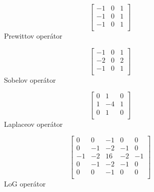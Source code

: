     \begin{figure}[!ht]
        \centering

        \begin{minipage}[b]{0.2\textwidth}
            \[
                \begin{bmatrix}
                    -1 & 0 & 1 \\
                    -1 & 0 & 1 \\
                    -1 & 0 & 1 \\
                \end{bmatrix}
            \]
            \centering
            Prewittov operátor
        \end{minipage}
        \begin{minipage}[b]{0.2\textwidth}
            \[
                \begin{bmatrix}
                    -1 & 0 & 1 \\
                    -2 & 0 & 2 \\
                    -1 & 0 & 1 \\
                \end{bmatrix}
            \]
            \centering
            Sobelov operátor
        \end{minipage}
        \begin{minipage}[b]{0.2\textwidth}
            \[
                \begin{bmatrix}
                    0 &  1 & 0 \\
                    1 & -4 & 1 \\
                    0 &  1 & 0 \\
                \end{bmatrix}
            \]
            \centering
            Laplaceov operátor
        \end{minipage}
        
        \begin{minipage}[b]{0.4\textwidth}
            \[
                \begin{bmatrix}
                    0 & 0 & -1 & 0 & 0 \\
                    0 & -1 & -2 & -1 & 0 \\
                    -1 & -2 & 16 & -2 & -1 \\
                    0 & -1 & -2 & -1 & 0 \\
                    0 & 0 & -1 & 0 & 0 \\
                \end{bmatrix}
            \]
            \centering
            LoG operátor
        \end{minipage}
    \end{figure}

